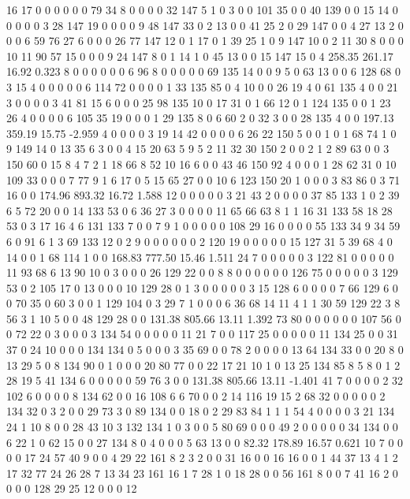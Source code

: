  16 17 0 0 0 0 0 0 79 34 8 0 0 0 0 32 147 5 1 0
 3 0 0 101 35 0 0 40 139 0 0 15 14 0 0 0 0 0 3 28
 147 19 0 0 0 0 9 48 147 33 0 2 13 0 0 41 25 2 0 29
 147 0 0 4 27 13 2 0 0 0 6 59 76 27 6 0 0 0 26 77
 147 12 0 1 17 0 1 39 25 1 0 9 147 10 0 2 11 30 8 0
 0 0 10 11 90 57 15 0 0 0 9 24 147 8 0 1 14 1 0 45
 13 0 0 15 147 15 0 4
258.35 261.17 16.92 0.323
 8 0 0 0 0 0 0 6 96 8 0 0 0 0 0 69 135 14 0 0
 9 5 0 63 13 0 0 6 128 68 0 3 15 4 0 0 0 0 0 6
 114 72 0 0 0 0 1 33 135 85 0 4 10 0 0 26 19 4 0 61
 135 4 0 0 21 3 0 0 0 0 3 41 81 15 6 0 0 0 25 98
 135 10 0 17 31 0 1 66 12 0 1 124 135 0 0 1 23 26 4 0
 0 0 0 6 105 35 19 0 0 0 1 29 135 8 0 6 60 2 0 32
 3 0 0 28 135 4 0 0
197.13 359.19 15.75 -2.959
 4 0 0 0 0 3 19 14 42 0 0 0 0 6 26 22 150 5 0 0
 1 0 1 68 74 1 0 9 149 14 0 13 35 6 3 0 0 4 15 20
 63 5 9 5 2 11 32 30 150 2 0 0 2 1 2 89 63 0 0 3
 150 60 0 15 8 4 7 2 1 18 66 8 52 10 16 6 0 0 43 46
 150 92 4 0 0 0 1 28 62 31 0 10 109 33 0 0 0 7 77 9
 1 6 17 0 5 15 65 27 0 0 10 6 123 150 20 1 0 0 0 3
 83 86 0 3 71 16 0 0
174.96 893.32 16.72 1.588
 12 0 0 0 0 0 3 21 43 2 0 0 0 0 37 85 133 1 0 2
 39 6 5 72 20 0 0 14 133 53 0 6 36 27 3 0 0 0 0 11
 65 66 63 8 1 1 16 31 133 58 18 28 53 0 3 17 16 4 6 131
 133 7 0 0 7 9 1 0 0 0 0 0 108 29 16 0 0 0 0 55
 133 34 9 34 59 6 0 91 6 1 3 69 133 12 0 2 9 0 0 0
 0 0 0 2 120 19 0 0 0 0 0 15 127 31 5 39 68 4 0 14
 0 0 1 68 114 1 0 0
168.83 777.50 15.46 1.511
 24 7 0 0 0 0 0 3 122 81 0 0 0 0 0 11 93 68 6 13
 90 10 0 3 0 0 0 26 129 22 0 0 8 8 0 0 0 0 0 0
 126 75 0 0 0 0 0 3 129 53 0 2 105 17 0 13 0 0 0 10
 129 28 0 1 3 0 0 0 0 0 3 15 128 6 0 0 0 0 7 66
 129 6 0 0 70 35 0 60 3 0 0 1 129 104 0 3 29 7 1 0
 0 0 6 36 68 14 11 4 1 1 30 59 129 22 3 8 56 3 1 10
 5 0 0 48 129 28 0 0
131.38 805.66 13.11 1.392
 73 80 0 0 0 0 0 0 107 56 0 0 72 22 0 3 0 0 0 3
 134 54 0 0 0 0 0 11 21 7 0 0 117 25 0 0 0 0 0 11
 134 25 0 0 31 37 0 24 10 0 0 0 134 134 0 5 0 0 0 3
 35 69 0 0 78 2 0 0 0 0 13 64 134 33 0 0 20 8 0 13
 29 5 0 8 134 90 0 1 0 0 0 20 80 77 0 0 22 17 21 10
 1 0 13 25 134 85 8 5 8 0 1 2 28 19 5 41 134 6 0 0
 0 0 0 59 76 3 0 0
131.38 805.66 13.11 -1.401
 41 7 0 0 0 0 2 32 102 6 0 0 0 0 8 134 62 0 0 16
 108 6 6 70 0 0 2 14 116 19 15 2 68 32 0 0 0 0 0 2
 134 32 0 3 2 0 0 29 73 3 0 89 134 0 0 18 0 2 29 83
 84 1 1 1 54 4 0 0 0 0 3 21 134 24 1 10 8 0 0 28
 43 10 3 132 134 1 0 3 0 0 5 80 69 0 0 0 49 2 0 0
 0 0 0 34 134 0 0 6 22 1 0 62 15 0 0 27 134 8 0 4
 0 0 0 5 63 13 0 0
82.32 178.89 16.57 0.621
 10 7 0 0 0 0 17 24 57 40 9 0 0 4 29 22 161 8 2 3
 2 0 0 31 16 0 0 16 16 0 0 1 44 37 13 4 1 2 17 32
 77 24 26 28 7 13 34 23 161 16 1 7 28 1 0 18 28 0 0 56
 161 8 0 0 7 41 16 2 0 0 0 0 128 29 25 12 0 0 0 12
